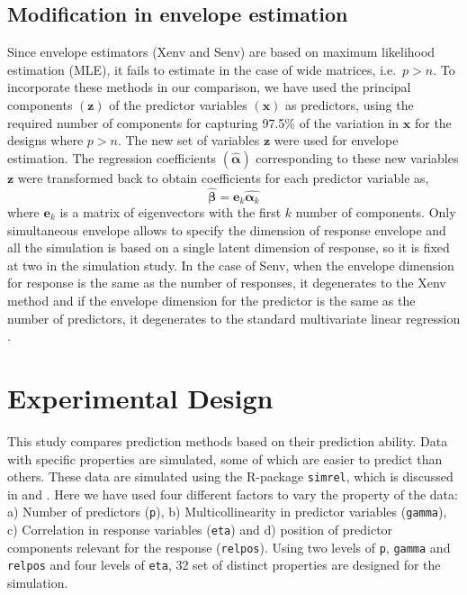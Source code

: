 \documentclass[review]{elsarticle}
\begin{document}
\hypertarget{modification-in-envelope-estimation}{%
\subsection{Modification in envelope estimation}\label{modification-in-envelope-estimation}}

Since envelope estimators (Xenv and Senv) are based on maximum likelihood estimation (MLE), it fails to estimate in the case of wide matrices, i.e.~\(p > n\). To incorporate these methods in our comparison, we have used the principal components \((\mathbf{z})\) of the predictor variables \((\mathbf{x})\) as predictors, using the required number of components for capturing 97.5\% of the variation in \(\mathbf{x}\) for the designs where \(p > n\). The new set of variables \(\mathbf{z}\) were used for envelope estimation. The regression coefficients \((\hat{\boldsymbol{\alpha}})\) corresponding to these new variables \(\mathbf{z}\) were transformed back to obtain coefficients for each predictor variable as,
\[\hat{\boldsymbol{\beta}} = \mathbf{e}_k\hat{\boldsymbol{\alpha}_k}\]
where \(\mathbf{e}_k\) is a matrix of eigenvectors with the first \(k\) number of components. Only simultaneous envelope allows to specify the dimension of response envelope and all the simulation is based on a single latent dimension of response, so it is fixed at two in the simulation study. In the case of Senv, when the envelope dimension for response is the same as the number of responses, it degenerates to the Xenv method and if the envelope dimension for the predictor is the same as the number of predictors, it degenerates to the standard multivariate linear regression \citep{env2018}.

\hypertarget{experimental-design}{%
\section{Experimental Design}\label{experimental-design}}

This study compares prediction methods based on their prediction ability. Data with specific properties are simulated, some of which are easier to predict than others. These data are simulated using the R-package \texttt{simrel}, which is discussed in \citet{saebo2015simrel} and \citet{Rimal2018}. Here we have used four different factors to vary the property of the data: a) Number of predictors (\texttt{p}), b) Multicollinearity in predictor variables (\texttt{gamma}), c) Correlation in response variables (\texttt{eta}) and d) position of predictor components relevant for the response (\texttt{relpos}). Using two levels of \texttt{p}, \texttt{gamma} and \texttt{relpos} and four levels of \texttt{eta}, 32 set of distinct properties are designed for the simulation.
\end{document}
